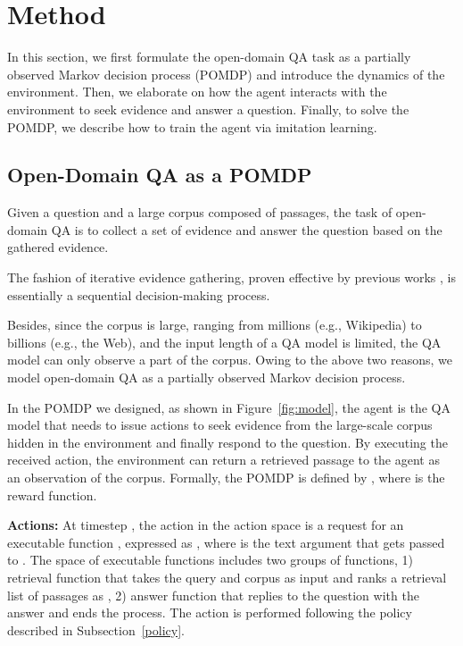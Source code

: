 \documentclass[11pt]{article}
\begin{document}
\section{Method}
In this section, we first formulate the open-domain QA task as a partially observed Markov decision process (POMDP) and introduce the dynamics of the environment.
Then, we elaborate on how the agent interacts with the environment to seek evidence and answer a question.
Finally, to solve the POMDP, we describe how to train the agent via imitation learning.

\subsection{Open-Domain QA as a POMDP}\label{odqa_pomdp}
Given a question  and a large corpus  composed of passages, the task of open-domain QA is to collect a set of evidence  and answer the question based on the gathered evidence.

The fashion of iterative evidence gathering, proven effective by previous works \citep{das2018multistep, Asai2020Learning, xiong2021answering}, is essentially a sequential decision-making process.

Besides, since the corpus is large, ranging from millions (e.g., Wikipedia) to billions (e.g., the Web), and the input length of a QA model is limited, the QA model can only observe a part of the corpus.
Owing to the above two reasons, we model open-domain QA as a partially observed Markov decision process.

In the POMDP we designed, as shown in Figure~\ref{fig:model}, the agent is the QA model that needs to issue actions to seek evidence from the large-scale corpus hidden in the environment and finally respond to the question.
By executing the received action, the environment can return a retrieved passage to the agent as an observation of the corpus.
Formally, the POMDP is defined by , where  is the reward function.



\textbf{Actions:} 
At timestep , the action  in the action space  is a request for an executable function , expressed as , where  is the text argument that gets passed to .
The space of executable functions  includes two groups of functions,
1) retrieval function that takes the query  and corpus  as input and ranks a retrieval list of passages as , 
2) answer function that replies to the question  with the answer  and ends the process.
The action  is performed following the policy  described in Subsection~\ref{policy}.
\end{document}
